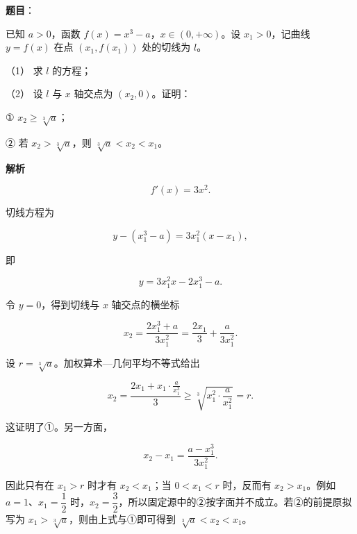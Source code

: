 \begin{answer}

\textbf{题目}：

已知 $a>0$，函数 $f(x)=x^3-a$，$x\in(0,+\infty)$。设 $x_1>0$，记曲线 $y=f(x)$ 在点 $(x_1,f(x_1))$ 处的切线为 $l$。

（1） 求 $l$ 的方程；

（2） 设 $l$ 与 $x$ 轴交点为 $(x_2,0)$。证明：

① $x_2\geqslant\sqrt[3]{a}$；

② 若 $x_2>\sqrt[3]{a}$，则 $\sqrt[3]{a}<x_2<x_1$。

\textbf{解析}


\nopagebreak[4]
\[
f'(x)=3x^2.
\]

切线方程为

\nopagebreak[4]
\[
y-(x_1^3-a)=3x_1^2(x-x_1),
\]

即

\nopagebreak[4]
\[
y=3x_1^2x-2x_1^3-a.
\]


令 $y=0$，得到切线与 $x$ 轴交点的横坐标

\nopagebreak[4]
\[
x_2=\frac{2x_1^3+a}{3x_1^2}
=\frac{2x_1}{3}+\frac{a}{3x_1^2}.
\]

设 $r=\sqrt[3]{a}$。加权算术—几何平均不等式给出

\nopagebreak[4]
\[
x_2=\frac{2x_1+x_1\cdot\frac{a}{x_1^3}}3
\geqslant
\sqrt[3]{x_1^2\cdot\frac{a}{x_1^2}}
=r.
\]

这证明了①。另一方面，

\nopagebreak[4]
\[
x_2-x_1=\frac{a-x_1^3}{3x_1^2}.
\]

因此只有在 $x_1>r$ 时才有 $x_2<x_1$；当 $0<x_1<r$ 时，反而有 $x_2>x_1$。例如 $a=1\text{、}x_1=\dfrac12$ 时，$x_2=\dfrac32$，所以固定源中的②按字面并不成立。若②的前提原拟写为 $x_1>\sqrt[3]{a}$，则由上式与①即可得到 $\sqrt[3]{a}<x_2<x_1$。



\end{answer}
